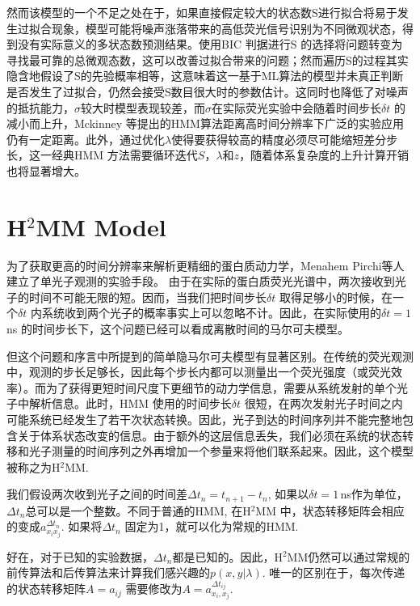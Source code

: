\documentclass[11pt, a4paper]{article}
\begin{document}
然而该模型的一个不足之处在于，如果直接假定较大的状态数S进行拟合将易于发生过拟合现象，模型可能将噪声涨落带来的高低荧光信号识别为不同微观状态，得到没有实际意义的多状态数预测结果。使用BIC 判据进行S 的选择将问题转变为寻找最可靠的总微观态数，这可以改善过拟合带来的问题；然而遍历S的过程其实隐含地假设了S的先验概率相等，这意味着这一基于ML算法的模型并未真正判断是否发生了过拟合，仍然会接受S数目很大时的参数估计。这同时也降低了对噪声的抵抗能力，$\sigma$较大时模型表现较差，而$\sigma$在实际荧光实验中会随着时间步长$\delta t$ 的减小而上升，Mckinney 等提出的HMM算法距离高时间分辨率下广泛的实验应用仍有一定距离。此外，通过优化$\lambda$使得要获得较高的精度必须尽可能缩短差分步长，这一经典HMM 方法需要循环迭代$S$，$\lambda$和$z$，随着体系复杂度的上升计算开销也将显著增大。



\section{H$^2$MM Model}\label{chapter:H2MM}

    为了获取更高的时间分辨率来解析更精细的蛋白质动力学，Menahem Pirchi等人建立了单光子观测的实验手段\cite{H2MM}。 由于在实际的蛋白质荧光光谱中，两次接收到光子的时间不可能无限的短。因而，当我们把时间步长$\delta t$ 取得足够小的时候，在一个$\delta t$ 内系统收到两个光子的概率事实上可以忽略不计。因此，在实际使用的$\delta t = 1\,$ns 的时间步长下，这个问题已经可以看成离散时间的马尔可夫模型。

    但这个问题和序言中所提到的简单隐马尔可夫模型有显著区别。在传统的荧光观测中，观测的步长足够长，因此每个步长内都可以测量出一个荧光强度（或荧光效率）。而为了获得更短时间尺度下更细节的动力学信息，需要从系统发射的单个光子中解析信息。此时，HMM 使用的时间步长$\delta t$ 很短，在两次发射光子时间之内可能系统已经发生了若干次状态转换。因此，光子到达的时间序列并不能完整地包含关于体系状态改变的信息。由于额外的这层信息丢失，我们必须在系统的状态转移和光子测量的时间序列之外再增加一个参量来将他们联系起来。因此，这个模型被称之为H$^2$MM.

    我们假设两次收到光子之间的时间差$\Delta t_n = t_{n+1}-t_n$, 如果以$\delta t=1\,$ns作为单位，$\Delta t_n$总可以是一个整数。不同于普通的HMM, 在H$^2$MM 中，状态转移矩阵会相应的变成$a_{x_ix_j}^{\Delta t_n}$. 如果将$\Delta t_n$ 固定为1，就可以化为常规的HMM.

    好在，对于已知的实验数据，$\Delta t_n$都是已知的。因此，H$^2$MM仍然可以通过常规的前传算法和后传算法来计算我们感兴趣的$p(x,y|\lambda)$. 唯一的区别在于，每次传递的状态转移矩阵$A=a_{ij}$ 需要修改为$A=a^{\Delta t_{ij}}_{x_i, x_j}$.
\end{document}
